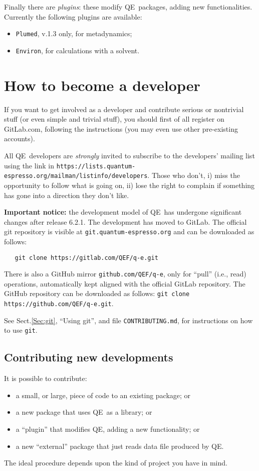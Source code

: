 \documentclass[12pt,a4paper]{article}
\def\qe{QE}
\begin{document}
Finally there are {\em plugins}: these modify \qe\ packages, adding
new functionalities. Currently the following plugins are available:
\begin{itemize}
\item \texttt{Plumed},  v.1.3 only, for metadynamics;
\item \texttt{Environ}, for calculations with a solvent.
\end{itemize}

\section{How to become a developer}
\label{SubSec:BeDev}

If you want to get involved as a developer and contribute serious
or nontrivial stuff (or even simple and trivial stuff), you should
first of all register on GitLab.com, following the instructions
(you may even use other pre-existing accounts).

All \qe\ developers are {\em strongly} invited to subscribe to the
developers' mailing list using the link
in \texttt{https://lists.quantum-espresso.org/mailman/listinfo/developers}.
Those who don't, i) miss the opportunity to follow what is going on,
ii) lose the right to complain if something has gone into a direction
they don't like. 

{\bf Important notice:} the development model of \qe\ has undergone
significant changes after release 6.2.1. The development has moved to 
GitLab. The official git repository is visible at
\texttt{git.quantum-espresso.org} and can be downloaded as follows:
\begin{verbatim}
   git clone https://gitlab.com/QEF/q-e.git
\end{verbatim}

There is also a GitHub mirror \texttt{github.com/QEF/q-e}, only for
``pull'' (i.e., read) operations, automatically kept aligned with
the official GitLab repository. The GitHub repository can be downloaded
as follows: \texttt{git clone https://github.com/QEF/q-e.git}.

See Sect.\ref{Sec:git}, ``Using git'',  and file \texttt{CONTRIBUTING.md},
for instructions on how to use \texttt{git}.

\subsection{Contributing new developments}
\label{SubSec:Contrib}

It is possible to contribute:
\begin{itemize}
\item a small, or large, piece of code to an existing package; or
\item a new package that uses \qe\ as a library; or
\item a ``plugin'' that modifies \qe, adding a new functionality; or
\item a new ``external'' package that just reads data file produced by QE.
\end{itemize}
The ideal procedure depends upon the kind of project you have in mind.
\end{document}
